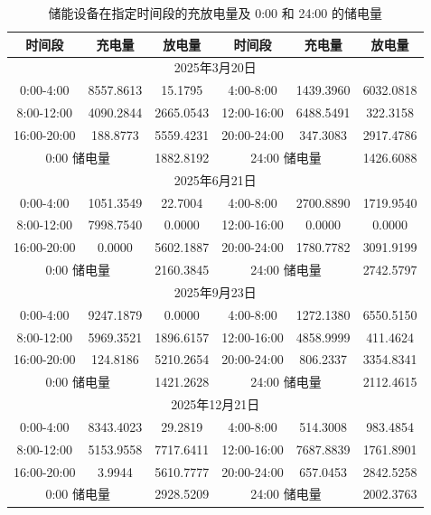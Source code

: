 \documentclass[withoutpreface,bwprint]{cumcmthesis}
\begin{document}
\begin{table}[h!]
	\centering
	\footnotesize
	\renewcommand{\arraystretch}{1.2}
	\setlength{\tabcolsep}{15pt}
	\caption{储能设备在指定时间段的充放电量及 0:00 和 24:00 的储电量}
	\label{tab:q43_spec_2}
	\begin{tabular}{|c|c|c|c|c|c|}
		\hline
		时间段 & 充电量 & 放电量 & 时间段 & 充电量 & 放电量 \\ \hline
		\multicolumn{6}{|c|}{2025年3月20日} \\ \hline
		0:00-4:00 & 8557.8613 & 15.1795 & 4:00-8:00 & 1439.3960 & 6032.0818 \\ \hline
		8:00-12:00 & 4090.2844 & 2665.0543 & 12:00-16:00 & 6488.5491 & 322.3158 \\ \hline
		16:00-20:00 & 188.8773 & 5559.4231 & 20:00-24:00 & 347.3083 & 2917.4786 \\ \hline
		\multicolumn{2}{|c|}{0:00 储电量} & 1882.8192 & \multicolumn{2}{c|}{24:00 储电量} & 1426.6088 \\ \hline
		\multicolumn{6}{|c|}{2025年6月21日} \\ \hline
		0:00-4:00 & 1051.3549 & 22.7004 & 4:00-8:00 & 2700.8890 & 1719.9540 \\ \hline
		8:00-12:00 & 7998.7540 & 0.0000 & 12:00-16:00 & 0.0000 & 0.0000 \\ \hline
		16:00-20:00 & 0.0000 & 5602.1887 & 20:00-24:00 & 1780.7782 & 3091.9199 \\ \hline
		\multicolumn{2}{|c|}{0:00 储电量} & 2160.3845 & \multicolumn{2}{c|}{24:00 储电量} & 2742.5797 \\ \hline
		\multicolumn{6}{|c|}{2025年9月23日} \\ \hline
		0:00-4:00 & 9247.1879 & 0.0000 & 4:00-8:00 & 1272.1380 & 6550.5150 \\ \hline
		8:00-12:00 & 5969.3521 & 1896.6157 & 12:00-16:00 & 4858.9999 & 411.4624 \\ \hline
		16:00-20:00 & 124.8186 & 5210.2654 & 20:00-24:00 & 806.2337 & 3354.8341 \\ \hline
		\multicolumn{2}{|c|}{0:00 储电量} & 1421.2628 & \multicolumn{2}{c|}{24:00 储电量} & 2112.4615 \\ \hline
		\multicolumn{6}{|c|}{2025年12月21日} \\ \hline
		0:00-4:00 & 8343.4023 & 29.2819 & 4:00-8:00 & 514.3008 & 983.4854 \\ \hline
		8:00-12:00 & 5153.9558 & 7717.6411 & 12:00-16:00 & 7687.8839 & 1761.8901 \\ \hline
		16:00-20:00 & 3.9944 & 5610.7777 & 20:00-24:00 & 657.0453 & 2842.5258 \\ \hline
		\multicolumn{2}{|c|}{0:00 储电量} & 2928.5209 & \multicolumn{2}{c|}{24:00 储电量} & 2002.3763 \\ \hline
	\end{tabular}
\end{table}
\end{document}

